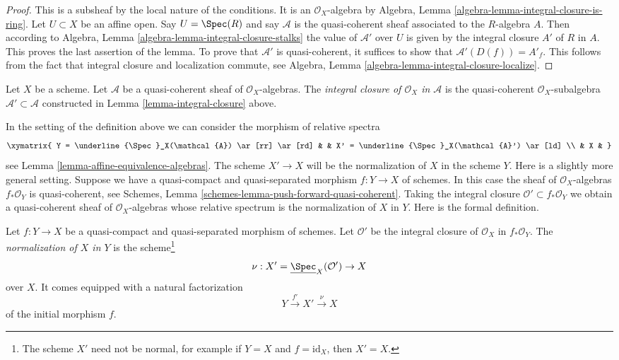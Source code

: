 \begin{proof}
This is a subsheaf by the local nature of the conditions.
It is an $\mathcal{O}_X$-algebra by
Algebra, Lemma \ref{algebra-lemma-integral-closure-is-ring}.
Let $U \subset X$ be an affine open. Say $U = \Spec(R)$
and say $\mathcal{A}$ is the quasi-coherent sheaf associated to
the $R$-algebra $A$. Then according to
Algebra, Lemma \ref{algebra-lemma-integral-closure-stalks}
the value of $\mathcal{A}'$ over $U$ is given by the integral
closure $A'$ of $R$ in $A$. This proves the last assertion of
the lemma. To prove that $\mathcal{A}'$ is quasi-coherent, it
suffices to show that $\mathcal{A}'(D(f)) = A'_f$. This follows
from the fact that integral closure and localization commute, see
Algebra, Lemma \ref{algebra-lemma-integral-closure-localize}.
\end{proof}

\begin{definition}
\label{definition-integral-closure}
Let $X$ be a scheme. Let $\mathcal{A}$ be a quasi-coherent sheaf
of $\mathcal{O}_X$-algebras. The {\it integral closure of $\mathcal{O}_X$
in $\mathcal{A}$} is the quasi-coherent $\mathcal{O}_X$-subalgebra
$\mathcal{A}' \subset \mathcal{A}$ constructed in
Lemma \ref{lemma-integral-closure} above.
\end{definition}

\noindent
In the setting of the definition above we can consider the morphism
of relative spectra
$$
\xymatrix{
Y = \underline{\Spec}_X(\mathcal{A}) \ar[rr] \ar[rd] & &
X' = \underline{\Spec}_X(\mathcal{A}') \ar[ld] \\
& X &
}
$$
see Lemma \ref{lemma-affine-equivalence-algebras}.
The scheme $X' \to X$ will be the normalization of $X$ in the scheme $Y$.
Here is a slightly more general setting. Suppose we have a
quasi-compact and quasi-separated morphism $f : Y \to X$
of schemes. In this case the sheaf of
$\mathcal{O}_X$-algebras $f_*\mathcal{O}_Y$ is quasi-coherent, see
Schemes, Lemma \ref{schemes-lemma-push-forward-quasi-coherent}.
Taking the integral closure $\mathcal{O}' \subset f_*\mathcal{O}_Y$
we obtain a quasi-coherent sheaf of $\mathcal{O}_X$-algebras
whose relative spectrum is the normalization of $X$ in $Y$. Here is
the formal definition.

\begin{definition}
\label{definition-normalization-X-in-Y}
Let $f : Y \to X$ be a quasi-compact and quasi-separated morphism of schemes.
Let $\mathcal{O}'$ be the integral closure of $\mathcal{O}_X$ in
$f_*\mathcal{O}_Y$. The {\it normalization of $X$ in $Y$} is the
scheme\footnote{The scheme $X'$ need not be normal, for example if
$Y = X$ and $f = \text{id}_X$, then $X' = X$.}
$$
\nu : X' = \underline{\Spec}_X(\mathcal{O}') \to X
$$
over $X$. It comes equipped with a natural factorization
$$
Y \xrightarrow{f'} X' \xrightarrow{\nu} X
$$
of the initial morphism $f$.
\end{definition}

